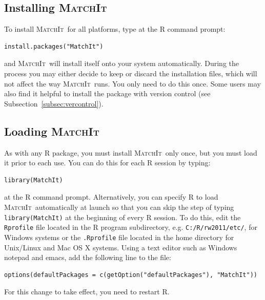 \documentclass[oneside,letterpaper,titlepage]{article}
\newcommand{\MatchIt}{\textsc{MatchIt}}
\begin{document}
\subsection{Installing \MatchIt}

To install \MatchIt\ for all platforms, type at the R command prompt:
\begin{verbatim}
install.packages("MatchIt")
\end{verbatim}
and \MatchIt\ will install itself onto your system automatically.
During the process you may either decide to keep or discard the
installation files, which will not affect the way \MatchIt\ runs.  You
only need to do this once.  Some users may also find it helpful to
install the package with version control (see
Subsection~\ref{subsec:vercontrol}).

\subsection{Loading \MatchIt}
As with any R package, you must install \MatchIt\ only once, but you
must load it prior to each use.  You can do this for each R session by
typing:
\begin{verbatim}
library(MatchIt) 
\end{verbatim}
at the R command prompt.  Alternatively, you can specify R to load
\MatchIt\ automatically at launch so that you can skip the step of
typing {\tt library(MatchIt)} at the beginning of every R session.  To
do this, edit the {\tt Rprofile} file located in the R program
subdirectory, e.g. \texttt{C:/R/rw2011/etc/}, for Windows systems or
the {\tt .Rprofile} file located in the home directory for Unix/Linux
and Mac OS X systems.  Using a text editor such as Windows notepad and
emacs, add the following line to the file:
\begin{verbatim}
options(defaultPackages = c(getOption("defaultPackages"), "MatchIt"))
\end{verbatim}
For this change to take effect, you need to restart R.

%
\end{document}
